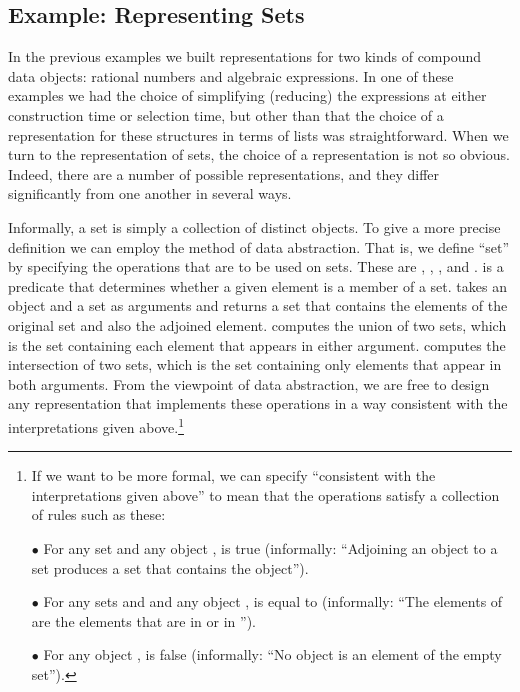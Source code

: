 \subsection{Example: Representing Sets}
\label{Section 2.3.3}

In the previous examples we built representations for two kinds of compound
data objects: rational numbers and algebraic expressions.  In one of these
examples we had the choice of simplifying (reducing) the expressions at either
construction time or selection time, but other than that the choice of a
representation for these structures in terms of lists was straightforward. When
we turn to the representation of sets, the choice of a representation is not so
obvious.  Indeed, there are a number of possible representations, and they
differ significantly from one another in several ways.

Informally, a set is simply a collection of distinct objects.  To give a more
precise definition we can employ the method of data abstraction.  That is, we
define ``set'' by specifying the operations that are to be used on sets.  These
are , , ,
and .   is a predicate that
determines whether a given element is a member of a set.  
takes an object and a set as arguments and returns a set that contains the
elements of the original set and also the adjoined element.  
computes the union of two sets, which is the set containing each element that
appears in either argument.   computes the intersection
of two sets, which is the set containing only elements that appear in both
arguments. From the viewpoint of data abstraction, we are free to design any
representation that implements these operations in a way consistent with the
interpretations given above.\footnote{If we want to be more formal, we can
specify ``consistent with the interpretations given above'' to mean that the
operations satisfy a collection of rules such as these:

\noindent
\( \bullet \) For any set  and any object ,
is true (informally: ``Adjoining an object to a
set produces a set that contains the object'').

\noindent
\( \bullet \) For any sets  and  and any object ,
is equal to
(informally: ``The elements of  are the elements that
are in  or in '').

\noindent
\( \bullet \) For any object ,
is false (informally: ``No object is an element of the empty set'').
}

